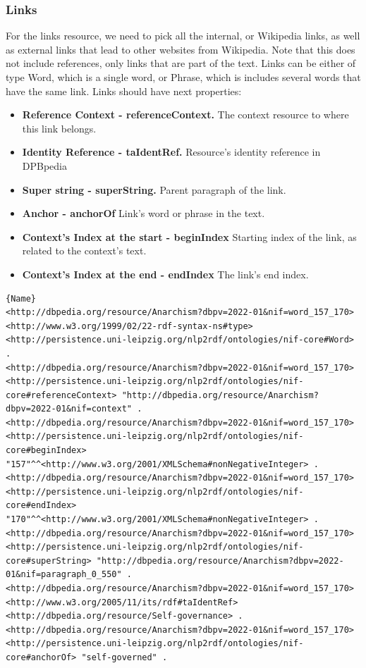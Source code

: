 \documentclass[thesis=M,english,hidelinks]{FITthesis}[2019/12/23]
\begin{document}
\subsubsection{Links}

For the links resource, we need to pick all the internal, or Wikipedia links, as well as external links that lead to other websites from Wikipedia. Note that this does not include references, only links that are part of the text. Links can be either of type Word, which is a single word, or Phrase, which is includes several words that have the same link. Links should have next properties:

\begin{itemize}
	\item \textbf{Reference Context - referenceContext.} The context resource to where this link belongs.
	\item \textbf{Identity Reference - taIdentRef.} Resource's identity reference in DPBpedia
	\item \textbf{Super string - superString.} Parent paragraph of the link.
	\item \textbf{Anchor - anchorOf} Link's word or phrase in the text.
	\item \textbf{Context's Index at the start - beginIndex} Starting index of the link, as related to the context's text.
	\item \textbf{Context's Index at the end - endIndex} The link's end index.
\end{itemize}


\begin{lstlisting}[caption=Example of an output for a Word link in NIF format,frame=tlrb,  label = {lst:nif-links}]{Name}
<http://dbpedia.org/resource/Anarchism?dbpv=2022-01&nif=word_157_170> <http://www.w3.org/1999/02/22-rdf-syntax-ns#type> <http://persistence.uni-leipzig.org/nlp2rdf/ontologies/nif-core#Word> .
<http://dbpedia.org/resource/Anarchism?dbpv=2022-01&nif=word_157_170> <http://persistence.uni-leipzig.org/nlp2rdf/ontologies/nif-core#referenceContext> "http://dbpedia.org/resource/Anarchism?dbpv=2022-01&nif=context" .
<http://dbpedia.org/resource/Anarchism?dbpv=2022-01&nif=word_157_170> <http://persistence.uni-leipzig.org/nlp2rdf/ontologies/nif-core#beginIndex> "157"^^<http://www.w3.org/2001/XMLSchema#nonNegativeInteger> .
<http://dbpedia.org/resource/Anarchism?dbpv=2022-01&nif=word_157_170> <http://persistence.uni-leipzig.org/nlp2rdf/ontologies/nif-core#endIndex> "170"^^<http://www.w3.org/2001/XMLSchema#nonNegativeInteger> .
<http://dbpedia.org/resource/Anarchism?dbpv=2022-01&nif=word_157_170> <http://persistence.uni-leipzig.org/nlp2rdf/ontologies/nif-core#superString> "http://dbpedia.org/resource/Anarchism?dbpv=2022-01&nif=paragraph_0_550" .
<http://dbpedia.org/resource/Anarchism?dbpv=2022-01&nif=word_157_170> <http://www.w3.org/2005/11/its/rdf#taIdentRef> <http://dbpedia.org/resource/Self-governance> .
<http://dbpedia.org/resource/Anarchism?dbpv=2022-01&nif=word_157_170> <http://persistence.uni-leipzig.org/nlp2rdf/ontologies/nif-core#anchorOf> "self-governed" .
\end{lstlisting}
\end{document}
